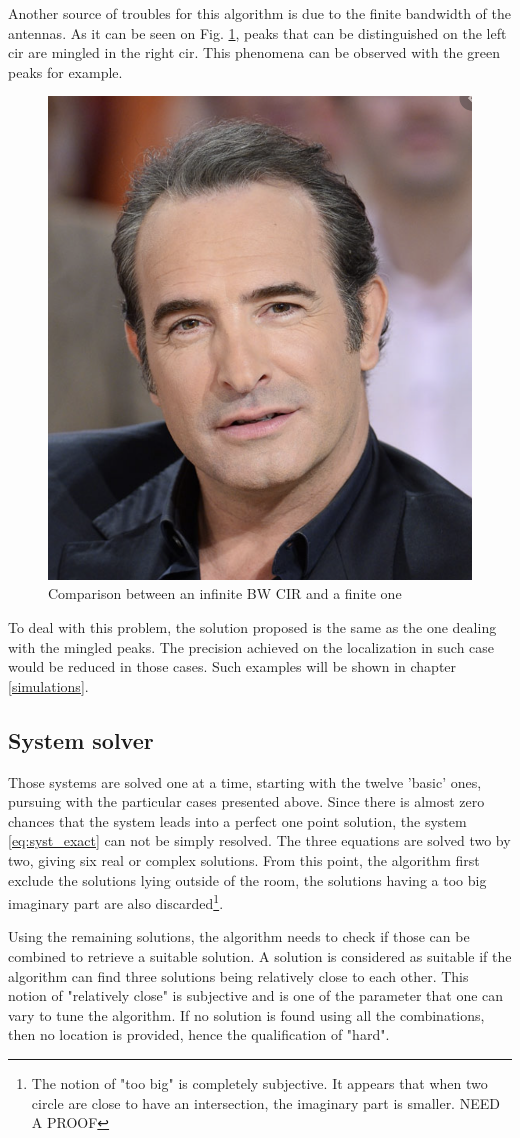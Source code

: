 Another source of troubles for this algorithm is due to the finite bandwidth of the antennas. As it can be seen on Fig. \ref{fig:inftofin}, peaks that can be distinguished on the left \gls{cir} are mingled in the right \gls{cir}. This phenomena can be observed with the green peaks for example.

\begin{figure}[H]
\centering
\includegraphics[width=.2\linewidth]{Images/Temporary_pic.png}
\caption{Comparison between an infinite BW CIR and a finite one \label{fig:inftofin}}
\end{figure}

To deal with this problem, the solution proposed is the same as the one dealing with the mingled peaks. The precision achieved on the localization in such case would be reduced  in those cases. Such examples will be shown in chapter \ref{simulations}.
\vspace{2mm}

\subsection{System solver}

Those systems are solved one at a time, starting with the twelve 'basic' ones, pursuing with the particular cases presented above. Since there is almost zero chances that the system leads into a perfect one point solution, the system \ref{eq:syst_exact} can not be simply resolved. The three equations are solved two by two, giving six real or complex solutions. From this point, the algorithm first exclude the solutions lying outside of the room, the solutions having a too big imaginary part are also discarded\footnote{The notion of "too big" is completely subjective. It appears that when two circle are close to have an intersection, the imaginary part is smaller. \color{red} NEED A PROOF \color{black}}. 
\vspace{2mm}

Using the remaining solutions, the algorithm needs to check if those can be combined to retrieve a suitable solution. A solution is considered as suitable if the algorithm can find three solutions being relatively close to each other. This notion of "relatively close" is subjective and is one of the parameter that one can vary to tune the algorithm. If no solution is found using all the combinations, then no location is provided, hence the qualification of "hard".
\vspace{2mm}

